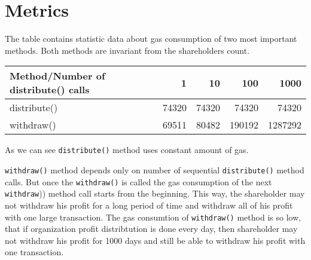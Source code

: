 \documentclass[onecolumn]{article}
\begin{document}
\section{Metrics}
The table contains statistic data about gas consumption of two most important methods. Both methods are invariant from the shareholders count.

\begin{center}
	\begin{tabular}{| l | r | r | r | r |}
		\hline
		Method/Number of distribute() calls & 1 & 10 & 100 & 1000 \\ \hline
		distribute() & 74320 & 74320 & 74320 & 74320 \\ \hline
		withdraw() & 69511 & 80482 & 190192 & 1287292\\
		\hline
	\end{tabular}
\end{center}

As we can see \lstinline{distribute()} method uses constant amount of gas.

\lstinline{withdraw()} method depends only on number of sequential \lstinline{distribute()} method calls. But once the \lstinline{withdraw()} is called the gas consumption of the next \lstinline(withdraw()) method call starts from the beginning. This way, the shareholder may not withdraw his profit for a long period of time and withdraw all of his profit with one large transaction. The gas consumtion of \lstinline{withdraw()} method is so low, that if organization profit distribtution is done every day, then shareholder may not withdraw his profit for 1000 days and still be able to withdraw his profit with one transaction.
\end{document}
